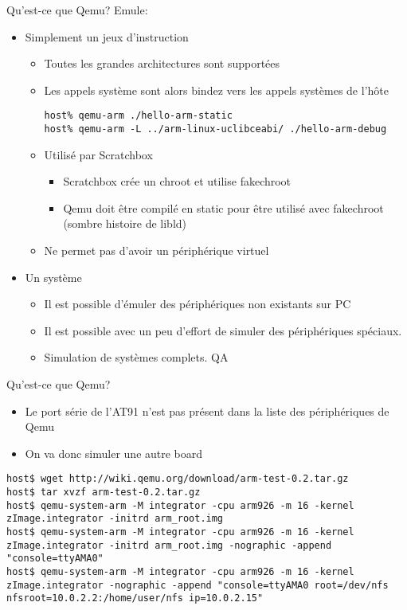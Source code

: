 \begin{frame}[fragile=singleslide]{Qu'est-ce que Qemu?}
  Emule:
  \begin{itemize}
  \item Simplement un jeux d'instruction 
    \begin{itemize}
    \item Toutes les grandes architectures sont supportées
    \item  Les  appels  système  sont  alors bindez  vers  les  appels
      systèmes de l'hôte
      \begin{lstlisting}
host% qemu-arm ./hello-arm-static
host% qemu-arm -L ../arm-linux-uclibceabi/ ./hello-arm-debug
      \end{lstlisting}
    \item Utilisé par Scratchbox
      \begin{itemize}
      \item Scratchbox crée un chroot et utilise fakechroot
      \item Qemu  doit être compilé  en static pour être  utilisé avec
        fakechroot (sombre histoire de libld) %
      \end{itemize}
    \item Ne permet pas d'avoir un périphérique virtuel
    \end{itemize}
  \item Un système
    \begin{itemize}
    \item Il est possible  d'émuler des périphériques non existants sur
      PC
    \item  Il  est  possible  avec  un peu  d'effort  de  simuler  des
      périphériques spéciaux.
    \item Simulation de systèmes complets. QA
    \end{itemize}
  \end{itemize}
\end{frame}

\begin{frame}[fragile=singleslide]{Qu'est-ce que Qemu?}
  \begin{itemize}
  \item Le  port série de l'AT91  n'est pas présent dans  la liste des
    périphériques de Qemu
  \item On va donc simuler une autre board
  \end{itemize}
  \begin{lstlisting}[basicstyle=\ttfamily\scriptsize\color{colBasic}]
host$ wget http://wiki.qemu.org/download/arm-test-0.2.tar.gz
host$ tar xvzf arm-test-0.2.tar.gz
host$ qemu-system-arm -M integrator -cpu arm926 -m 16 -kernel zImage.integrator -initrd arm_root.img
host$ qemu-system-arm -M integrator -cpu arm926 -m 16 -kernel zImage.integrator -initrd arm_root.img -nographic -append "console=ttyAMA0"
host$ qemu-system-arm -M integrator -cpu arm926 -m 16 -kernel zImage.integrator -nographic -append "console=ttyAMA0 root=/dev/nfs nfsroot=10.0.2.2:/home/user/nfs ip=10.0.2.15"
  \end{lstlisting}
\end{frame}

